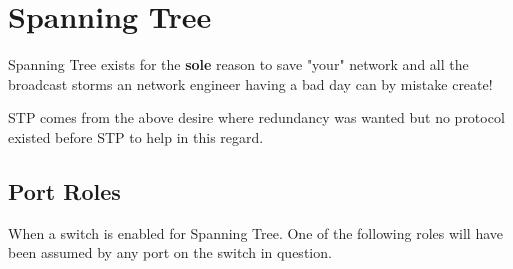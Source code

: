 
\section{Spanning Tree}

Spanning Tree exists for the \textbf{sole} reason to save "your" network and all the broadcast storms an network engineer having a bad day can by mistake create!

STP comes from the above desire where redundancy was wanted but no protocol existed before STP to help in this regard.

\begin{table}[h]
	\centering
	\caption{Spanning Tree standrds}
	\label{stpstandards}
\end{table}

\subsection{Port Roles}

When a switch is enabled for Spanning Tree. One of the following roles will have been assumed by any port on the switch in question.

